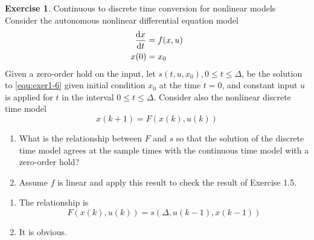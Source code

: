 \documentclass[11pt,a4paper]{report}
\theoremstyle{definition}\newtheorem{exercise}{Exercise}[chapter]
\begin{document}
\begin{exercise}Continuous to discrete time conversion for nonlinear models\\
Consider the autonomous nonlinear differential equation model 
\begin{align}\label{equ:exer1-6}
    \dv{x}{t}&=f(x,u)\\
    x(0)&=x_0
\end{align} 
Given a zero-order hold on the input, let $s(t,u,x_0),0\le t\le\Delta$, be the solution to \eqref{equ:exer1-6} given initial condition $x_0$ at the time $t=0$, and constant input $u$ is applied for $t$ in the interval $0\le t\le\Delta$. Consider also the nonlinear discrete time model
\begin{equation}
    x(k+1)=F(x(k),u(k))
\end{equation}
\begin{enumerate}[label=(\alph*)]
    \item What is the relationship between $F$ and $s$ so that the solution of the discrete time model agrees at the sample times with the continuous time model with a zero-order hold?
    \item Assume $f$ is linear and apply this result to check the result of Exercise 1.5.
\end{enumerate}
\end{exercise}

\begin{answer}
\begin{enumerate}[label=(\alph*)]
    \item The relationship is 
    \begin{equation}
        F(x(k),u(k))=s(\Delta,u(k-1),x(k-1))
    \end{equation}
    \item It is obvious.
\end{enumerate}
\end{answer}
\end{document}
